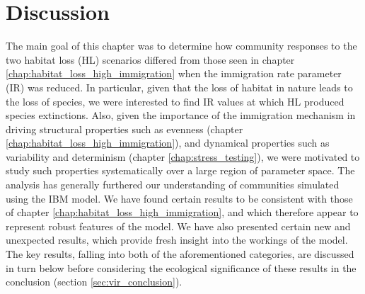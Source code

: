 %

\section{Discussion}
\label{sec:vir_discussion}


The main goal of this chapter was to determine how community responses to the two habitat loss (HL) scenarios differed from those seen in chapter \ref{chap:habitat_loss_high_immigration} when the immigration rate parameter (IR) was reduced. In particular, given that the loss of habitat in nature leads to the loss of species, we were interested to find IR values at which HL produced species extinctions. Also, given the importance of the immigration mechanism in driving structural properties such as evenness (chapter \ref{chap:habitat_loss_high_immigration}), and dynamical properties such as variability and determinism (chapter \ref{chap:stress_testing}), we were motivated to study such properties systematically over a large region of parameter space. The analysis has generally furthered our understanding of communities simulated using the IBM model. We have found certain results to be consistent with those of chapter \ref{chap:habitat_loss_high_immigration}, and which therefore appear to represent robust features of the model. We have also presented certain new and unexpected results, which provide fresh insight into the workings of the model. The key results, falling into both of the aforementioned categories, are discussed in turn below before considering the ecological significance of these results in the conclusion (section \ref{sec:vir_conclusion}). 

